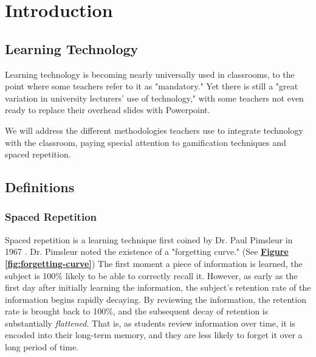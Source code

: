 \chapter{Introduction}

\section{Learning Technology}


\par Learning technology is becoming nearly universally used in classrooms, to the point where some teachers refer to it as "mandatory." \cite{BJET:BJET12051} Yet there is still a "great variation in university lecturers' use of technology," with some teachers not even ready to replace their overhead slides with Powerpoint.

\par We will address the different methodologies teachers use to integrate technology with the classroom, paying special attention to gamification techniques and spaced repetition.

\section{Definitions}

\subsection{Spaced Repetition}
\par Spaced repetition is a learning technique first coined by Dr. Paul Pimsleur in 1967 \cite{pimsleur1967memory}. Dr. Pimsleur noted the existence of a "forgetting curve." (See \textbf{\hyperref[fig:forgetting-curve]{Figure \ref*{fig:forgetting-curve}}}) The first moment a piece of information is learned, the subject is 100\% likely to be able to correctly recall it. However, as early as the first day after initially learning the information, the subject's retention rate of the information begins rapidly decaying. By reviewing the information, the retention rate is brought back to 100\%, and the subsequent decay of retention is substantially \textit{flattened}. That is, as students review information over time, it is encoded into their long-term memory, and they are less likely to forget it over a long period of time.

